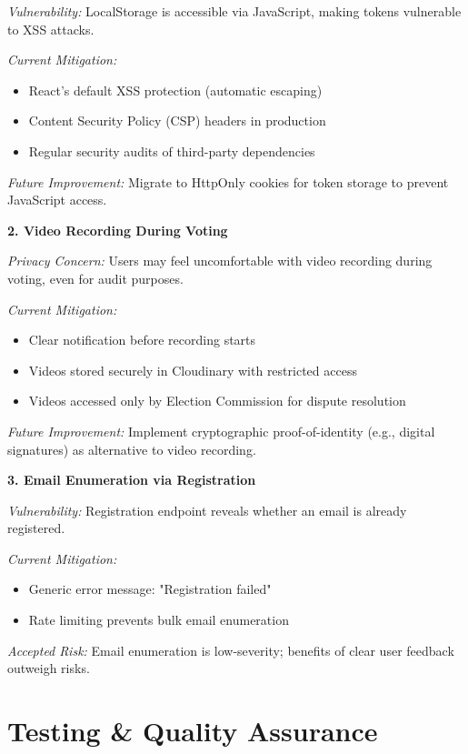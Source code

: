\documentclass[12pt,a4paper]{article}
\begin{document}
\textit{Vulnerability:} LocalStorage is accessible via JavaScript, making tokens vulnerable to XSS attacks.

\textit{Current Mitigation:}
\begin{itemize}[noitemsep]
  \item React's default XSS protection (automatic escaping)
  \item Content Security Policy (CSP) headers in production
  \item Regular security audits of third-party dependencies
\end{itemize}

\textit{Future Improvement:} Migrate to HttpOnly cookies for token storage to prevent JavaScript access.

\textbf{2. Video Recording During Voting}

\textit{Privacy Concern:} Users may feel uncomfortable with video recording during voting, even for audit purposes.

\textit{Current Mitigation:}
\begin{itemize}[noitemsep]
  \item Clear notification before recording starts
  \item Videos stored securely in Cloudinary with restricted access
  \item Videos accessed only by Election Commission for dispute resolution
\end{itemize}

\textit{Future Improvement:} Implement cryptographic proof-of-identity (e.g., digital signatures) as alternative to video recording.

\textbf{3. Email Enumeration via Registration}

\textit{Vulnerability:} Registration endpoint reveals whether an email is already registered.

\textit{Current Mitigation:}
\begin{itemize}[noitemsep]
  \item Generic error message: "Registration failed"
  \item Rate limiting prevents bulk email enumeration
\end{itemize}

\textit{Accepted Risk:} Email enumeration is low-severity; benefits of clear user feedback outweigh risks.

\section{Testing \& Quality Assurance}
\end{document}
